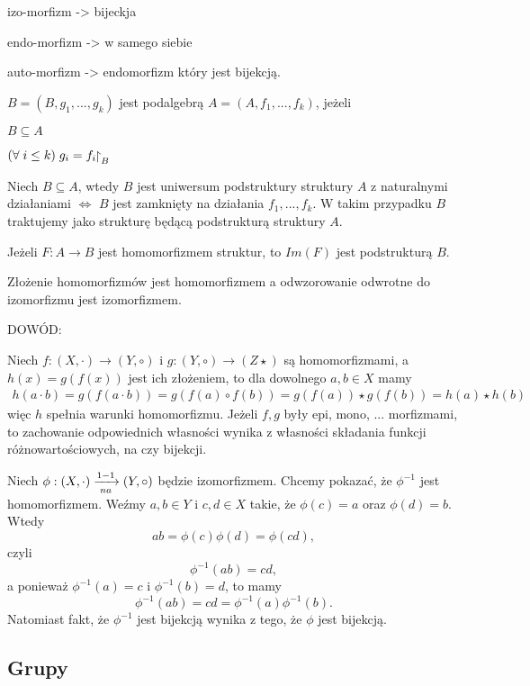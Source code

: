     \point izo-morfizm -> bijeckja

    \point endo-morfizm -> w samego siebie

    \point auto-morfizm -> endomorfizm który jest bijekcją.
\smallskip

\kdef
\medskip

$B=(B, g_1,...,g_k)$ jest {\color{def}podalgebrą} $A=(A, f_1,...,f_k)$, jeżeli

\point $B\subseteq A$

\point $(\forall\;i\leq k)\;g_i=f_i\obet_ B$
\medskip

Niech $B\subseteq A$, wtedy $B$ jest uniwersum podstruktury struktury $A$ z naturalnymi działaniami $\iff$ $B$ jest zamknięty na działania $f_1,...,f_k$. W takim przypadku $B$ traktujemy jako strukturę będącą podstrukturą struktury $A$.
\medskip

Jeżeli $F:A\to B$ jest homomorfizmem struktur, to $Im(F)$ jest podstrukturą $B$.
\bigskip

{\color{acc}Złożenie homomorfizmów jest homomorfizmem} a odwzorowanie odwrotne do izomorfizmu jest izomorfizmem.
\medskip

{\color{def}DOWÓD:}
\smallskip

Niech $f:(X, \cdot)\to(Y, \circ)$ i $g:(Y, \circ)\to(Z\star)$ są homomorfizmami, a $h(x)=g(f(x))$ jest ich złożeniem, to dla dowolnego $a,b\in X$ mamy
\begin{align*}
    h(a\cdot b)=g(f(a\cdot b))=g(f(a)\circ f(b))=g(f(a))\star g(f(b))=h(a)\star h(b)
\end{align*}
więc $h$ spełnia warunki homomorfizmu. Jeżeli $f, g$ były epi, mono, ... morfizmami, to zachowanie odpowiednich własności wynika z własności składania funkcji różnowartościowych, na czy bijekcji.
\smallskip

Niech $\phi:(X, \cdot)\xrightarrow[na]{1-1} (Y, \circ)$ będzie izomorfizmem. Chcemy pokazać, że $\phi^{-1}$ jest homomorfizmem. Weźmy $a, b\in Y$ i $c, d\in X$ takie, że $\phi(c)=a$ oraz $\phi(d)=b$. Wtedy
$$ab=\phi(c)\phi(d)=\phi(cd),$$
czyli
$$\phi^{-1}(ab)=cd,$$
a ponieważ $\phi^{-1}(a)=c$ i $\phi^{-1}(b)=d$, to mamy
$$\phi^{-1}(ab)=cd=\phi^{-1}(a)\phi^{-1}(b).$$
Natomiast fakt, że $\phi^{-1}$ jest bijekcją wynika z tego, że $\phi$ jest bijekcją.

\subsection{Grupy}

